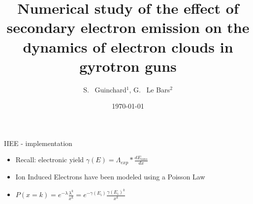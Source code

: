 \documentclass[aspectratio=169,xcolor=dvipsnames,8pt]{beamer}
\title[Summary]{Numerical study of the effect of secondary electron emission on the dynamics of electron clouds in gyrotron guns}
\author[S.Guinchard] {S. ~Guinchard$^{1}$, G. ~Le Bars$^{2}$}
\institute[SPH] %
{
    $^1$ Ecole Polytechnique Fédérale de Lausanne (EPFL), Physics Section (SPH), CH-1015 Lausanne, Switzerland\\
    $^2$ Ecole Polytechnique Fédérale de Lausanne (EPFL), Swiss Plasma Center (SPC), CH-1015 Lausanne, Switzerland\\
    \vspace{1cm}
}
\date{\today} %
\begin{document}
\begin{frame}
    \titlepage
\end{frame}


\begin{frame}{IIEE - implementation}

\begin{itemize}


\item{Recall: electronic yield $\gamma(E) = \Lambda_{exp}*\frac{dE_{ions}}{dx}$ }
\item{Ion Induced Electrons have been modeled using a Poisson Law}
\vspace{1cm}
\item{$P(x=k) = e^{-\lambda}\frac{\lambda^k}{x^k} =  e^{-\gamma(E_i)}\frac{\gamma(E_i)^k}{x^k} $}
\end{itemize}
\end{frame}


\end{document}
